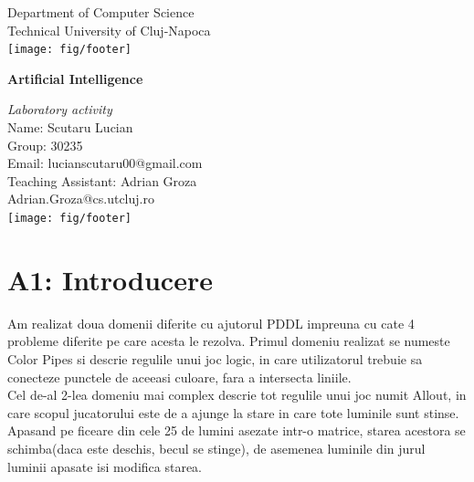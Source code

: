 \documentclass[a4paper,12pt]{report}
\begin{document}
\vspace{-5cm}
\begin{center}
Department of Computer Science\\
Technical University of Cluj-Napoca\\
\texttt{[image: fig/footer]}
\end{center}
\vspace{1cm}
\begin{center}
\begin{Large}
 \textbf{Artificial Intelligence}\\
\end{Large}
\textit{Laboratory activity}\\
\vspace{3cm}
Name: Scutaru Lucian\\
Group: 30235\\
Email: lucianscutaru00@gmail.com\\
\vspace{12cm}
Teaching Assistant: Adrian Groza\\
Adrian.Groza@cs.utcluj.ro\\
\vspace{1cm}
\texttt{[image: fig/footer]}
\end{center}

\tableofcontents




\chapter{A1: Introducere}

Am realizat doua domenii diferite cu ajutorul PDDL impreuna cu cate 4 probleme diferite pe care acesta le rezolva. Primul domeniu realizat se numeste Color Pipes si descrie regulile unui joc logic, in care utilizatorul trebuie sa conecteze punctele de aceeasi culoare, fara a intersecta liniile.\\
Cel de-al 2-lea domeniu mai complex descrie tot regulile unui joc numit Allout, in care scopul jucatorului este de a ajunge la stare in care tote luminile sunt stinse. Apasand pe ficeare din cele 25 de lumini asezate intr-o matrice, starea acestora se schimba(daca este deschis, becul se stinge), de asemenea luminile din jurul luminii apasate isi modifica starea.
\end{document}
